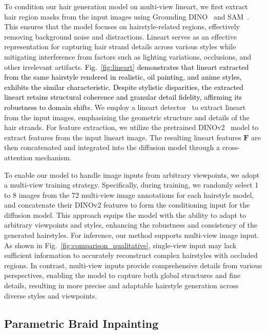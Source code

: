 To condition our hair generation model on multi-view lineart, we first extract hair region masks from the input images using Grounding DINO~\cite{liu2025grounding} and SAM~\cite{kirillov2023segment}. This ensures that the model focuses on hairstyle-related regions, effectively removing background noise and distractions. Lineart serves as an effective representation for capturing hair strand details across various styles while mitigating interference from factors such as lighting variations, occlusions, and other irrelevant artifacts. \textcolor{black}{Fig.~\ref{fig:lineart} demonstrates that lineart extracted from the same hairstyle rendered in realistic, oil painting, and anime styles, exhibits the similar characteristic. Despite stylistic disparities, the extracted lineart retains structural coherence and granular detail fidelity, affirming its robustness to domain shifts}. We employ a lineart detector~\cite{zhang2023adding} to extract lineart from the input images, emphasizing the geometric structure and details of the hair strands.
For feature extraction, we utilize the pretrained DINOv2~\cite{oquab2024dinov2} model to extract features from the input lineart image. The resulting lineart features $\mathbf{F}$ are then concatenated and integrated into the diffusion model through a cross-attention mechanism.



To enable our model to handle image inputs from arbitrary viewpoints, we adopt a multi-view training strategy. Specifically, during training, we randomly select 1 to 8 images from the 72 multi-view image annotations for each hairstyle model, and concatenate their DINOv2 features to form the conditioning input for the diffusion model. This approach equips the model with the ability to adapt to arbitrary viewpoints and styles, enhancing the robustness and consistency of the generated hairstyles.
%
For inference, our method supports multi-view image input. 
As shown in Fig.~\ref{fig:comparison_qualitative}, single-view input may lack sufficient information to accurately reconstruct complex hairstyles with occluded regions. In contrast, multi-view inputs provide comprehensive details from various perspectives, enabling the model to capture both global structures and fine details, resulting in more precise and adaptable hairstyle generation across diverse styles and viewpoints.



\subsection{Parametric Braid Inpainting}


